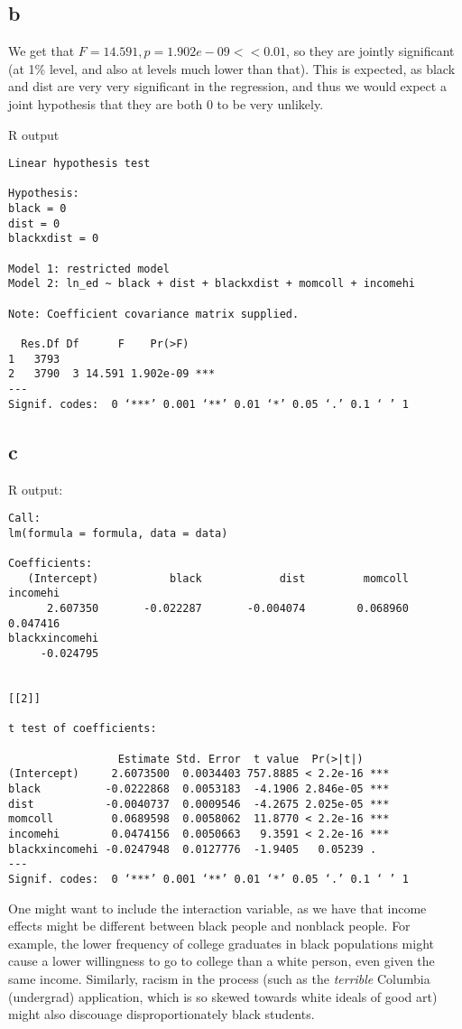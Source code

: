 \documentclass[12pt,letterpaper]{article}
\theoremstyle{definition}
\begin{document}
\subsection*{b}

We get that $F = 14.591, p = 1.902e-09 << 0.01$, so they are jointly significant (at 1\% level, and also at levels much lower than that). This is expected, as black and dist are very very significant in the regression, and thus we would expect a joint hypothesis that they are both 0 to be very unlikely.

R output
\begin{Verbatim}[fontsize=\small]
Linear hypothesis test

Hypothesis:
black = 0
dist = 0
blackxdist = 0

Model 1: restricted model
Model 2: ln_ed ~ black + dist + blackxdist + momcoll + incomehi

Note: Coefficient covariance matrix supplied.

  Res.Df Df      F    Pr(>F)
1   3793
2   3790  3 14.591 1.902e-09 ***
---
Signif. codes:  0 ‘***’ 0.001 ‘**’ 0.01 ‘*’ 0.05 ‘.’ 0.1 ‘ ’ 1
\end{Verbatim}

\subsection*{c}

R output:
\begin{Verbatim}[fontsize=\small]
Call:
lm(formula = formula, data = data)

Coefficients:
   (Intercept)           black            dist         momcoll        incomehi
      2.607350       -0.022287       -0.004074        0.068960        0.047416
blackxincomehi
     -0.024795


[[2]]

t test of coefficients:

                 Estimate Std. Error  t value  Pr(>|t|)
(Intercept)     2.6073500  0.0034403 757.8885 < 2.2e-16 ***
black          -0.0222868  0.0053183  -4.1906 2.846e-05 ***
dist           -0.0040737  0.0009546  -4.2675 2.025e-05 ***
momcoll         0.0689598  0.0058062  11.8770 < 2.2e-16 ***
incomehi        0.0474156  0.0050663   9.3591 < 2.2e-16 ***
blackxincomehi -0.0247948  0.0127776  -1.9405   0.05239 .
---
Signif. codes:  0 ‘***’ 0.001 ‘**’ 0.01 ‘*’ 0.05 ‘.’ 0.1 ‘ ’ 1
\end{Verbatim}

One might want to include the interaction variable, as we have that income effects might be different between black people and nonblack people. For example, the lower frequency of college graduates in black populations might cause a lower willingness to go to college than a white person, even given the same income. Similarly, racism in the process (such as the \textit{terrible} Columbia (undergrad) application, which is so skewed towards white ideals of good art) might also discouage disproportionately black students.
\end{document}
